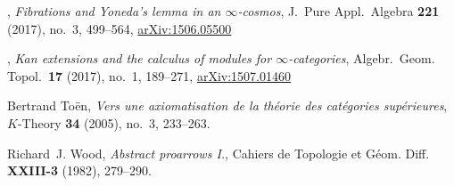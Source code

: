 \documentclass[12pt,reqno]{amsart}
\theoremstyle{plain}
\theoremstyle{definition}
\theoremstyle{remark}
\numberwithin{equation}{subsection}
\begin{document}
\begin{thebibliography}{RV-III}
\bysame, \emph{Fibrations and {Y}oneda's lemma in an $\infty$-cosmos}, J.~Pure Appl.~Algebra {\bf 221}
(2017), no.~3, 499--564, \href{http://arxiv.org/abs/1506.05500}{arXiv:1506.05500}


\bysame, \emph{Kan extensions and the calculus of modules for
  $\infty$-categories}, Algebr.~Geom. Topol.~{\bf 17} (2017), no.~1, 189--271,  \href{http://arxiv.org/abs/1507.01460}{arXiv:1507.01460}


Bertrand To{\"e}n, \emph{Vers une axiomatisation de la th\'eorie des
  cat\'egories sup\'erieures}, $K$-Theory \textbf{34} (2005), no.~3, 233--263.

Richard~J. Wood, \emph{Abstract proarrows {I}.}, Cahiers de Topologie et
  G\'eom. Diff. \textbf{\hbox{XXIII-3}} (1982), 279--290.

\end{thebibliography}
\end{document}
